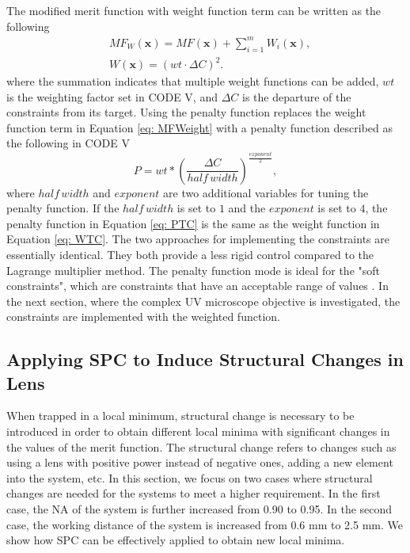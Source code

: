 The modified merit function with weight function term can be written as the following 
\setlength{\belowdisplayshortskip}{5pt}
\setlength{\abovedisplayshortskip}{5pt}
\begin{subequations} 
\begin{align}
& MF_{W}(\textbf{x})=MF(\textbf{x})+\sum_{i=1}^{m}W_i(\textbf{x}), \label{eq: MFWeight} \\
& W(\textbf{x})=(wt\cdot \Delta C)^2. \label{eq: WTC}
\end{align}
\end{subequations}
where the summation indicates that multiple weight functions can be added, $wt$ is the weighting factor set in CODE V, and $\Delta C$ is the departure of the constraints from its target. Using the penalty function replaces the weight function term in Equation \ref{eq: MFWeight} with a penalty function described as the following in CODE V
\setlength{\belowdisplayshortskip}{5pt}
\setlength{\abovedisplayshortskip}{5pt}
\begin{equation} \label{eq: PTC}
P = wt*(\frac{\Delta C}{half \, width})^{\frac{exponent}{2}},
\end{equation}where ${half \, width}$ and $exponent$ are two additional variables for tuning the penalty function. If the ${half \, width}$ is set to $1$ and the $exponent$ is set to $4$, the penalty function in Equation \ref{eq: PTC} is the same as the weight function in Equation \ref{eq: WTC}. The two approaches for implementing the constraints are essentially identical. They both provide a less rigid control compared to the Lagrange multiplier method. The penalty function mode is ideal for the "soft constraints", which are constraints that have an acceptable range of values \cite{codevmanual}. In the next section, where the complex UV microscope objective is investigated, the constraints are implemented with the weighted function.

\subsection{Applying SPC to Induce Structural Changes in Lens}
When trapped in a local minimum, structural change is necessary to be introduced in order to obtain different local minima with significant changes in the values of the merit function. The structural change refers to changes such as using a lens with positive power instead of negative ones, adding a new element into the system, etc. In this section, we focus on two cases where structural changes are needed for the systems to meet a higher requirement. In the first case, the NA of the system is further increased from 0.90 to 0.95. In the second case, the working distance of the system is increased from 0.6 mm to 2.5 mm. We show how SPC can be effectively applied to obtain new local minima. 

